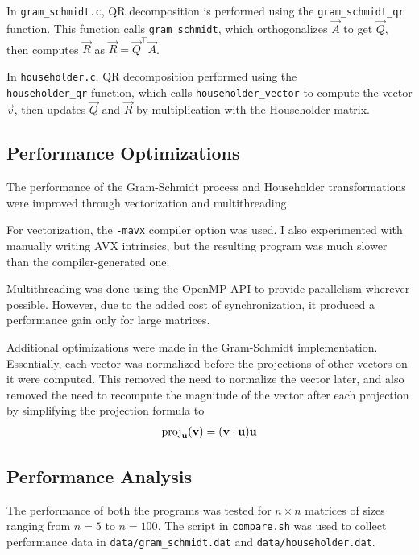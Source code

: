 \documentclass{article}
\begin{document}
In \texttt{gram\_schmidt.c}, QR decomposition is performed using the \texttt{gram\_schmidt\_qr}
function. This function calls \texttt{gram\_schmidt}, which orthogonalizes $\vec{A}$ to get $\vec{Q}$,
then computes $\vec{R}$ as $\vec{R} = \vec{Q}^\top\vec{A}$.

In \texttt{householder.c}, QR decomposition performed using the \\ \texttt{householder\_qr}
function, which calls \texttt{householder\_vector} to compute the vector $\vec{v}$,
then updates $\vec{Q}$ and $\vec{R}$ by multiplication with the Householder matrix.

\subsection{Performance Optimizations}

The performance of the Gram-Schmidt process and Householder transformations were improved
through vectorization and multithreading.

For vectorization, the \texttt{-mavx} compiler option was used. I also experimented with
manually writing AVX intrinsics, but the resulting program was much slower than the
compiler-generated one.

Multithreading was done using the OpenMP API to provide parallelism
wherever possible. However, due to the added cost of synchronization, it produced a
performance gain only for large matrices.

Additional optimizations were made in the Gram-Schmidt implementation. Essentially, each
vector was normalized before the projections of other vectors on it were computed.
This removed the need to normalize the vector later, and also removed the need to
recompute the magnitude of the vector after each projection by simplifying the projection
formula to
\begin{align}
    \operatorname{proj}_{\mathbf{u}}(\mathbf{v}) = (\mathbf{v} \cdot \mathbf{u}) \mathbf{u}
\end{align}

\subsection{Performance Analysis}

The performance of both the programs was tested for $n \times n$ matrices of sizes
ranging from $n = 5$ to $n = 100$. The script in \texttt{compare.sh} was used to
collect performance data in \texttt{data/gram\_schmidt.dat} and \texttt{data/householder.dat}.
\end{document}
